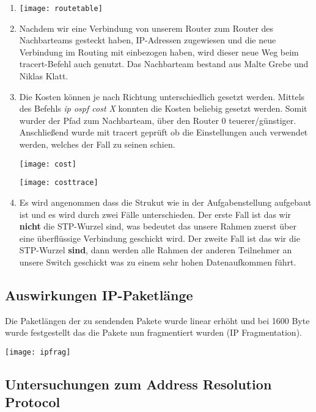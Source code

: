 \documentclass{scrartcl}
\begin{document}
\begin{enumerate}
    \item
   \texttt{[image: routetable]}
   \label{fig:routetable}
   
    \item
    Nachdem wir eine Verbindung von unserem Router zum Router des Nachbarteams gesteckt haben, IP-Adressen zugewiesen und die neue Verbindung im Routing mit einbezogen haben, wird dieser neue Weg beim tracert-Befehl auch genutzt. Das Nachbarteam bestand aus Malte Grebe und Niklas Klatt.
  
    \item
    Die Kosten können je nach Richtung unterschiedlich gesetzt werden. Mittels des Befehls \textit{ip ospf cost X} konnten die Kosten beliebig gesetzt werden. Somit wurder der Pfad zum Nachbarteam, über den Router 0 teuerer/günstiger. Anschließend wurde mit tracert geprüft ob die Einstellungen auch verwendet werden, welches der Fall zu seinen schien.

   \texttt{[image: cost]}
   \label{fig:cost}

   \texttt{[image: costtrace]}
   \label{fig:costtrace}

    \item
    Es wird angenommen dass die Strukut wie in der Aufgabenstellung aufgebaut ist und es wird durch zwei Fälle unterschieden. Der erste Fall ist das wir \textbf{nicht} die STP-Wurzel sind, was bedeutet das unsere Rahmen zuerst über eine überflüssige Verbindung geschickt wird. Der zweite Fall ist das wir die STP-Wurzel \textbf{sind}, dann werden alle Rahmen der anderen Teilnehmer an unsere Switch geschickt was zu einem sehr hohen Datenaufkommen führt.
    \end{enumerate}

\newpage
  \subsection[Aufgabe 7 Auswirkungen IP-Paketlänge]{Auswirkungen IP-Paketlänge}
 
    Die Paketlängen der zu sendenden Pakete wurde linear erhöht und bei 1600 Byte wurde festgestellt das die Pakete nun fragmentiert wurden (IP Fragmentation).

 \texttt{[image: ipfrag]}
   \label{fig:ipfrag}

  \subsection[Aufgabe 8 Untersuchungen zum Adress Resolution Protocol]{Untersuchungen zum Address Resolution Protocol}
  
\end{document}
